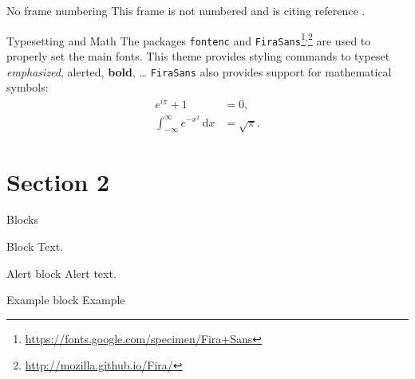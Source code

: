     \begin{frame}[noframenumbering]{No frame numbering}
        This frame is not numbered and is citing reference \cite{knuth74}.
    \end{frame}
    
    \begin{frame}{Typesetting and Math}
        The packages \texttt{fontenc} and \texttt{FiraSans}\footnote{\url{https://fonts.google.com/specimen/Fira+Sans}}\textsuperscript{,}\footnote{\url{http://mozilla.github.io/Fira/}} are used to properly set the main fonts.
        \vfill
        This theme provides styling commands to typeset \emph{emphasized}, \alert{alerted}, \textbf{bold}, \dots
        \vfill
        \texttt{FiraSans} also provides support for mathematical symbols:
        \begin{align*}
            e^{i\pi} + 1 & = 0, \\
            \int_{-\infty}^\infty e^{-x^2}\,\mathrm{d}x & = \sqrt{\pi}.
        \end{align*}
    \end{frame}

    \section{Section 2}
    \begin{frame}{Blocks}
        \begin{block}{Block}
            Text.
        \end{block}
        \pause
        \begin{alertblock}{Alert block}
            Alert \alert{text}.
        \end{alertblock}
        \pause
        \begin{exampleblock}{Example block}
            Example
        \end{exampleblock}
    \end{frame}
    

